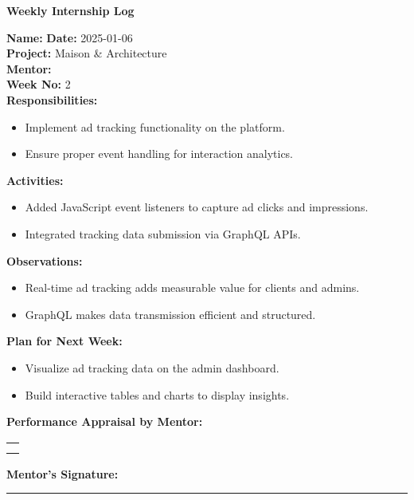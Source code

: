 \begin{center}
    \bfseries Weekly Internship Log
\end{center}

\noindent
\textbf{Name:}  \hfill \textbf{Date:} 2025-01-06 \\
\textbf{Project:} Maison \& Architecture \hfill \\
\textbf{Mentor:}  \\
\textbf{Week No:} 2 \\

\noindent
\textbf{Responsibilities:}
\begin{itemize}
    \item Implement ad tracking functionality on the platform.
    \item Ensure proper event handling for interaction analytics.
\end{itemize}

\noindent
\textbf{Activities:}
\begin{itemize}
    \item Added JavaScript event listeners to capture ad clicks and impressions.
    \item Integrated tracking data submission via GraphQL APIs.
\end{itemize}

\noindent
\textbf{Observations:}
\begin{itemize}
    \item Real-time ad tracking adds measurable value for clients and admins.
    \item GraphQL makes data transmission efficient and structured.
\end{itemize}

\noindent
\textbf{Plan for Next Week:}
\begin{itemize}
    \item Visualize ad tracking data on the admin dashboard.
    \item Build interactive tables and charts to display insights.
\end{itemize}

\noindent
\textbf{Performance Appraisal by Mentor:} \\
\begin{table}[h]
    \centering
    \noindent
    \begin{tabularx}{\textwidth} { 
        | >{\centering\arraybackslash}X| }

        \hline
        \\ \\
        \hline
    \end{tabularx}
\end{table}

\vspace{2em}
\noindent
\textbf{Mentor’s Signature:} \\
\rule{0.4\textwidth}{0.5pt}
